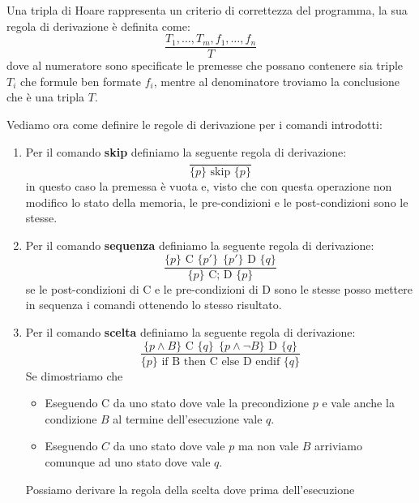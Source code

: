 Una tripla di Hoare rappresenta un criterio di correttezza del programma, la sua
regola di derivazione è definita come:
\begin{equation}
    \frac{T_1, \dots, T_m, f_1, \dots, f_n}{T}
\end{equation}
dove al numeratore sono specificate le premesse che possano contenere sia triple
$T_i$ che formule ben formate $f_i$, mentre al denominatore troviamo la conclusione
che è una tripla $T$.

Vediamo ora come definire le regole di derivazione per i comandi introdotti:
\begin{enumerate}
    \item Per il comando \textbf{skip} definiamo la seguente regola di derivazione:
          \begin{equation}
              \frac{}{\{p\} \text{ skip } \{p\}}
          \end{equation}
          in questo caso la premessa è vuota e, visto che con questa operazione
          non modifico lo stato della memoria, le pre-condizioni e le post-condizioni
          sono le stesse.
    \item Per il comando \textbf{sequenza} definiamo la seguente regola di derivazione:
          \begin{equation}
              \frac{\{p\} \text{ C } \{p'\} \ \ \{p'\} \text{ D } \{q\}}{\{p\} \text{ C; D } \{p\}}
          \end{equation}
          se le post-condizioni di C  e le pre-condizioni di D sono le stesse
          posso mettere in sequenza i comandi ottenendo lo stesso risultato.
    \item Per il comando \textbf{scelta} definiamo la seguente regola di derivazione:
          \begin{equation}
              \frac{\{p \land B\} \text{ C } \{q\} \ \ \{p \land \lnot B\} \text{ D } \{q\}}{\{p\} \text{ if B then C else D endif } \{q\}}
          \end{equation}
          Se dimostriamo che
          \begin{itemize}
              \item Eseguendo C da uno stato dove vale la precondizione $p$ e
                    vale anche la condizione $B$ al termine dell'esecuzione vale $q$.
              \item Eseguendo $C$ da uno stato dove vale $p$ ma non vale $B$
                    arriviamo comunque ad uno stato dove vale $q$.
          \end{itemize}
          Possiamo derivare la regola della scelta dove prima dell'esecuzione

\end{enumerate}
